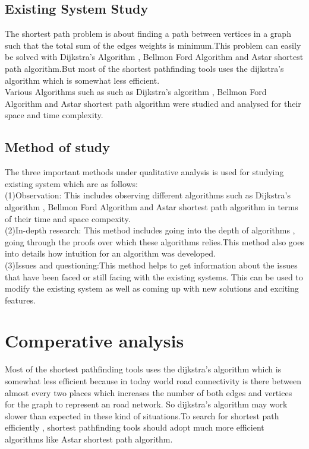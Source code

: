 \documentclass[14pt,a4]{extreport}
\begin{document}
\subsection*{Existing System Study}
The shortest path problem is about finding a path between  vertices in a graph such that the total sum of the edges weights is minimum.This problem can easily be solved with Dijkstra's Algorithm , Bellmon Ford Algorithm and Astar shortest path algorithm.But most of the shortest pathfinding tools uses the dijkstra's algorithm which is somewhat less efficient. \\
Various Algorithms such as such as Dijkstra's algorithm , Bellmon Ford Algorithm and Astar shortest path algorithm were studied and analysed for their space and time complexity.
\subsection*{Method of study}
The three important methods under qualitative analysis is used for studying existing system which are as follows:\\
(1)Observation: This includes observing different algorithms such as Dijkstra's algorithm , Bellmon Ford Algorithm and Astar shortest path algorithm in terms of their time and space compexity.\\
(2)In-depth research: This method includes going into the depth of algorithms , going through the proofs over which these algorithms relies.This method also goes into details how intuition for an algorithm was developed.\\
(3)Issues and questioning:This method helps to get information about the issues that have been faced or still facing with the existing systems. This can be used to modify the existing system as well as coming up with new solutions and exciting features.

\section{Comperative analysis}

Most of the shortest pathfinding tools uses the dijkstra's algorithm which is somewhat less efficient because in today world road connectivity is there between almost every two places which increases the number of both edges and vertices for the graph to represent an road network. So dijkstra's algorithm may work slower than expected in these kind of situations.To search for shortest path efficiently , shortest pathfinding tools should adopt much more efficient algorithms like Astar shortest path algorithm.
\end{document}

